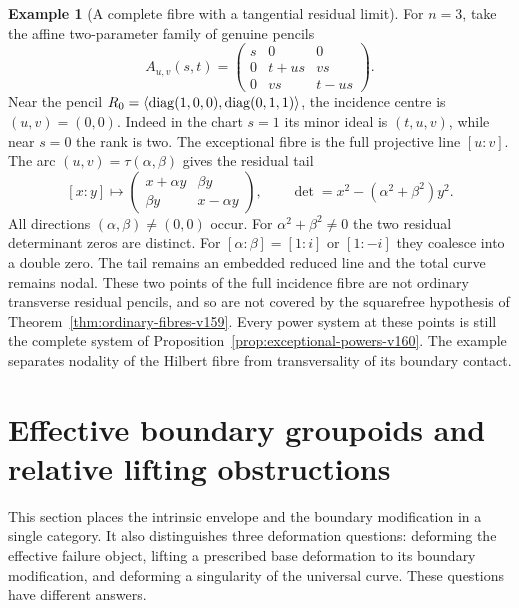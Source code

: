 \documentclass[11pt,reqno]{amsart}
\numberwithin{equation}{section}
\theoremstyle{definition}\newtheorem{definition}[theorem]{Definition}
\newtheorem{example}[theorem]{Example}
\theoremstyle{remark}\newtheorem{remark}[theorem]{Remark}
\begin{document}
\begin{example}[A complete fibre with a tangential residual limit]
\label{ex:tangent-limit-v160}
For $n=3$, take the affine two-parameter family of genuine pencils
\[
 A_{u,v}(s,t)=
 \begin{pmatrix}s&0&0\\0&t+us&vs\\0&vs&t-us\end{pmatrix}.
\]
Near the pencil $R_0=\langle\operatorname{diag}(1,0,0),\operatorname{diag}(0,1,1)\rangle$,
the incidence centre is $(u,v)=(0,0)$. Indeed in the chart $s=1$
its minor ideal is $(t,u,v)$, while near $s=0$ the rank is two.
The exceptional fibre is the full projective line $[u:v]$.
The arc $(u,v)=\tau(\alpha,\beta)$ gives the residual tail
\[
 [x:y]\longmapsto
 \begin{pmatrix}x+\alpha y&\beta y\\
                 \beta y&x-\alpha y\end{pmatrix},
 \qquad \det=x^2-(\alpha^2+\beta^2)y^2.
\]
All directions $(\alpha,\beta)\ne(0,0)$ occur. For
$\alpha^2+\beta^2\ne0$ the two residual determinant zeros are distinct.
For $[\alpha:\beta]=[1:i]$ or $[1:-i]$ they coalesce into a double
zero. The tail remains an embedded reduced line and the total curve
remains nodal. These two points of the full incidence fibre are not
ordinary transverse residual pencils, and so are not covered by the
squarefree hypothesis of Theorem~\ref{thm:ordinary-fibres-v159}.
Every power system at these points is still the complete system of
Proposition~\ref{prop:exceptional-powers-v160}. The example separates
nodality of the Hilbert fibre from transversality of its boundary
contact.
\end{example}


\section{Effective boundary groupoids and relative lifting obstructions}
\label{sec:effective-boundary-v161}
This section places the intrinsic envelope and the boundary modification
in a single category. It also distinguishes three deformation questions:
deforming the effective failure object, lifting a prescribed base
deformation to its boundary modification, and deforming a singularity
of the universal curve. These questions have different answers.
\end{document}
